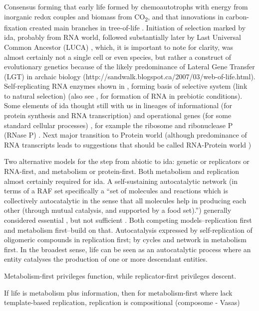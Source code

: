Consensus forming that early life formed by chemoautotrophs with energy
from inorganic redox couples and biomass from CO\textsubscript{2}, and
that innovations in carbon-fixation created main branches in
tree-of-life \autocite{Braakman2012}. Initiation of selection marked by
\gls{ida}, probably from RNA world, followed substantially later by Last
Universal Common Ancestor (LUCA) \autocite{Yarus2011}, which, it is
important to note for clarity, was almost certainly not a single cell or
even species, but rather a construct of evolutionary genetics because of
the likely predominance of Lateral Gene Transfer (LGT) in archaic
biology (http://sandwalk.blogspot.ca/2007/03/web-of-life.html).
Self-replicating RNA enzymes shown in \autocite{Lincoln2009}, forming
basis of selective system (link to natural selection) (also see
\autocite{Cheng2010}, \autocite{Powner2009} for formation of RNA in
prebiotic conditions). Some elements of \gls{ida} thought still with us
in lineages of informational (for protein synthesis and RNA
transcription) and operational genes (for some standard cellular
processes) \autocite{Ragan2009}, for example the ribosome and
ribonuclease P (RNase P) \autocite{Wilson2009}. Next major transition to
Protein world (although predominance of RNA transcripts leads to
suggestions that should be called RNA-Protein world
\autocite{Altman2013})

Two alternative models for the step from abiotic to \gls{ida}: genetic
or replicators or RNA-first, and metabolism or protein-first. Both
metabolism and replication almost certainly required for \gls{ida}. A
self-sustaining autocatalytic network (in terms of a RAF set
specifically a ``set of molecules and reactions which is collectively
autocatalytic in the sense that all molecules help in producing each
other (through mutual catalysis, and supported by a food set).'')
generally considered essential \autocite{Pross2013}, but not sufficient
\autocite{Hordijk2011}. Both competing models--replication first and
metabolism first--build on that. Autocatalysis expressed by
self-replication of oligomeric compounds in replication first; by cycles
and network in metabolism first. In the broadest sense, life can be seen
as an autocatalytic process where an entity catalyses the production of
one or more descendant entities.

Metabolism-first privileges function, while replicator-first privileges
descent.

If life is metabolism plus information, then for metabolism-first where
lack template-based replication, replication is compositional (composome
- Vasas)

